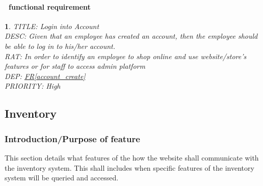 \documentclass{scrreprt}
\theoremstyle{funreq}
\newtheorem{funreq}{}
\newcommand*{\reqref}[1]{\hyperref[#1]{FR\ref*{#1}}}
\begin{document}
\paragraph[]{\Subsectionname ~functional requirement }
\begin{funreq}
	\label{account_login}
	TITLE: Login into Account\\
	DESC: Given that an employee has created an account, then the employee should be able to log in to his/her account.\\
	RAT: In order to identify an employee to shop online and use website/store’s features or for staff to access admin platform\\
	DEP: \reqref{account_create}\\
	PRIORITY: High\\
\end{funreq}

	\subsection{Inventory}
	\subsubsection{Introduction/Purpose of feature}
	This section details what features of the how the website shall communicate with the inventory system.  This shall includes when specific features of the inventory system will be queried and accessed.  
	
\end{document}
